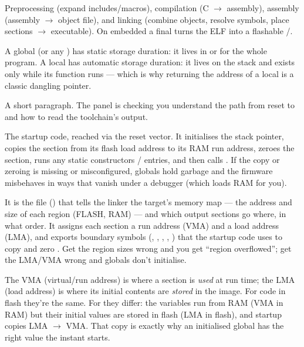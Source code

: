 Preprocessing (expand includes/macros), compilation (C $\rightarrow$
assembly), assembly (assembly $\rightarrow$ object file), and linking (combine
objects, resolve symbols, place sections $\rightarrow$ executable). On embedded
a final  turns the ELF into a flashable /.

A global (or any ) has static storage duration: it lives in
 or  for the whole program. A local has automatic
storage duration: it lives on the stack and exists only while its function
runs --- which is why returning the address of a local is a classic dangling
pointer.

%
{A short paragraph. The panel is checking you understand the path from reset
to  and how to read the toolchain's output.}

The startup code, reached via the reset vector. It initialises the stack
pointer, copies the  section from its flash load address to its
RAM run address, zeroes the  section, runs any static
constructors /  entries, and then calls . If the
 copy or  zeroing is missing or misconfigured, globals
hold garbage and the firmware misbehaves in ways that vanish under a debugger
(which loads RAM for you).

It is the file () that tells the linker the target's memory map ---
the address and size of each region (FLASH, RAM) --- and which output
sections go where, in what order. It assigns each section a run address (VMA)
and a load address (LMA), and exports boundary symbols (,
, , , ) that the startup
code uses to copy  and zero . Get the region sizes
wrong and you get ``region overflowed''; get the LMA/VMA wrong and globals
don't initialise.

The VMA (virtual/run address) is where a section is \emph{used} at run time;
the LMA (load address) is where its initial contents are \emph{stored} in the
image. For code in flash they're the same. For  they differ: the
variables run from RAM (VMA in RAM) but their initial values are stored in
flash (LMA in flash), and startup copies LMA $\rightarrow$ VMA. That copy is
exactly why an initialised global has the right value the instant 
starts.


